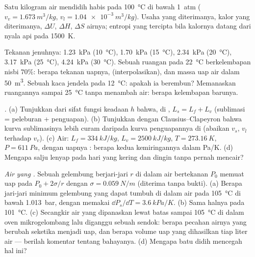 \begin{exercise}[$\star\star$]\label{exo:b1:phase-changes:8}
Satu kilogram air mendidih habis pada \qty{100}{\degreeCelsius} di bawah
\qty{1}{atm} ($v_v = \qty{1.673}{m^3/kg}$, $v_l = \qty{1.04e-3}{m^3/kg}$).
Usaha yang diterimanya, kalor yang diterimanya, $\Delta U$, $\Delta H$, $\Delta S$
airnya; entropi yang tercipta bila kalornya datang dari nyala api pada
\qty{1500}{K}.
\end{exercise}

\begin{exercise}[$\star\star$]\label{exo:b1:phase-changes:9}
Tekanan jenuhnya: \qty{1.23}{kPa} (\qty{10}{\degreeCelsius}), \qty{1.70}{kPa}
(\qty{15}{\degreeCelsius}), \qty{2.34}{kPa} (\qty{20}{\degreeCelsius}), \qty{3.17}{kPa}
(\qty{25}{\degreeCelsius}), \qty{4.24}{kPa} (\qty{30}{\degreeCelsius}). Sebuah ruangan
pada \qty{22}{\degreeCelsius} berkelembapan nisbi $70\%$: berapa tekanan
uapnya,  (interpolasikan), dan massa uap air dalam
\qty{50}{m^3}. Sebuah kaca jendela pada \qty{12}{\degreeCelsius}: apakah ia berembun?
Memanaskan ruangannya sampai \qty{25}{\degreeCelsius} tanpa menambah air: berapa
kelembapan barunya.
\end{exercise}

\begin{exercise}[$\star\star\star$]\label{exo:b1:phase-changes:10}
\emph{.} (a) Tunjukkan dari sifat fungsi keadaan
$h$ bahwa, di , $L_s = L_f + L_v$ (sublimasi = peleburan +
penguapan). (b) Tunjukkan dengan Clausius--Clapeyron bahwa kurva sublimasinya
lebih curam daripada kurva penguapannya di 
(abaikan $v_s$, $v_l$ terhadap $v_v$). (c) Air: $L_f = \qty{334}{kJ/kg}$,
$L_v = \qty{2500}{kJ/kg}$, $T = \qty{273.16}{K}$, $P = \qty{611}{Pa}$, dengan uapnya
: berapa kedua kemiringannya dalam \unit{Pa/K}. (d) Mengapa salju lenyap
pada hari yang kering dan dingin tanpa pernah mencair?
\end{exercise}

\begin{exercise}[$\star\star\star$]\label{exo:b1:phase-changes:11}
\emph{Air yang .} Sebuah gelembung berjari-jari $r$ di dalam air bertekanan
$P_0$ memuat uap pada $P_0 + 2\sigma/r$ dengan $\sigma = \qty{0.059}{N/m}$
(diterima tanpa bukti). (a) Berapa jari-jari minimum gelembung yang dapat tumbuh di dalam air pada
\qty{105}{\degreeCelsius} di bawah \qty{1.013}{bar}, dengan memakai
$\dd P_s/\dd T = \qty{3.6}{kPa/K}$. (b) Sama halnya pada \qty{101}{\degreeCelsius}.
(c) Secangkir air yang dipanaskan lewat batas sampai \qty{105}{\degreeCelsius} di dalam oven
mikrogelombang lalu diganggu sebuah sendok: berapa pecahan airnya yang berubah seketika menjadi
uap, dan berapa volume uap yang dihasilkan tiap liter air --- berilah komentar
tentang bahayanya. (d) Mengapa batu didih mencegah hal ini?
\end{exercise}

